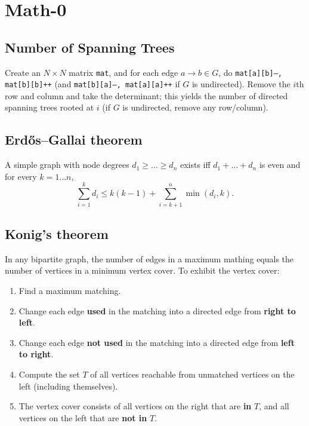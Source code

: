 \section{Math-0}
	\subsection{Number of Spanning Trees}
		Create an $N\times N$ matrix \texttt{mat}, and for each edge $a \rightarrow b \in G$, do
		\texttt{mat[a][b]--, mat[b][b]++} (and \texttt{mat[b][a]--, mat[a][a]++} if $G$ is undirected).
		Remove the $i$th row and column and take the determinant; this yields the number of directed spanning trees rooted at $i$
		(if $G$ is undirected, remove any row/column).

	\subsection{Erdős–Gallai theorem}
		A simple graph with node degrees $d_1 \ge \dots \ge d_n$ exists iff $d_1 + \dots + d_n$ is even and for every $k = 1\dots n$,
		\[ \sum _{i=1}^{k}d_{i}\leq k(k-1)+\sum _{i=k+1}^{n}\min(d_{i},k). \]

	\subsection{Konig's theorem}
  In any bipartite graph, the number of edges in a maximum mathing equals the number of vertices in a minimum vertex cover. To exhibit the vertex cover:\\
  \begin{enumerate}
  \item
  Find a maximum matching.
  \item
  Change each edge {\bf used} in the matching into a directed edge from {\bf right to left}.
  \item
  Change each edge {\bf not used} in the matching into a directed edge from {\bf left to right}.
  \item
  Compute the set $T$ of all vertices reachable from unmatched vertices on the left (including themselves).
  \item
  The vertex cover consists of all vertices on the right that are {\bf in} $T$, and all vertices on the left
  that are {\bf not in} $T$.
  \end{enumerate}

